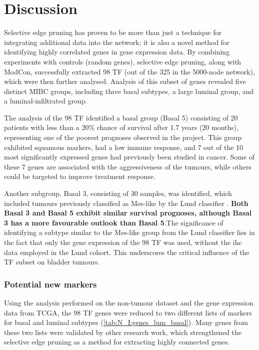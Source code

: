 \section{Discussion}

Selective edge pruning has proven to be more than just a technique for integrating additional data into the network; it is also a novel method for identifying highly correlated genes in gene expression data. By combining experiments with controls (random genes), selective edge pruning, along with ModCon, successfully extracted 98 TF (out of the 325 in the 5000-node network), which were then further analysed. Analysis of this subset of genes revealed five distinct MIBC groups, including three basal subtypes, a large luminal group, and a luminal-infiltrated group.

The analysis of the 98 TF identified a basal group (Basal 5) consisting of 20 patients with less than a 20\% chance of survival after 1.7 years (20 months), representing one of the poorest prognoses observed in the project. This group exhibited squamous markers, had a low immune response, and 7 out of the 10 most significantly expressed genes had previously been studied in cancer. Some of these 7 genes are associated with the aggressiveness of the tumours, while others could be targeted to improve treatment response.

Another subgroup, Basal 3, consisting of 30 samples, was identified, which included tumours previously classified as Mes-like by the Lund classifier \citep{Marzouka2018-ge}. \textbf{Both Basal 3 and Basal 5 exhibit similar survival prognoses, although Basal 3 has a more favourable outlook than Basal 5}.The significance of identifying a subtype similar to the Mes-like group from the Lund classifier lies in the fact that only the gene expression of the 98 TF was used, without the \acrlong{ihc} data employed in the Lund cohort. This underscores the critical influence of the TF subset on bladder tumours.



\subsubsection*{Potential new markers}

Using the analysis performed on the non-tumour dataset and the gene expression data from TCGA, the 98 TF genes were reduced to two different lists of markers for basal and luminal subtypes (\cref{tab:N_I:genes_lum_basal}). Many genes from these two lists were validated by other research work, which strengthened the selective edge pruning as a method for extracting highly connected genes.

